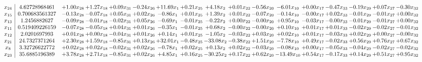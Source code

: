\documentclass[9pt]{article}
\begin{document}
 \[\begin{array}{c| c c@{\hskip 2pt} c@{\hskip 2pt} c@{\hskip 2pt} c@{\hskip 2pt} c@{\hskip 2pt} c@{\hskip 2pt} c@{\hskip 2pt} c@{\hskip 2pt} c@{\hskip 2pt} c@{\hskip 2pt} c@{\hskip 2pt} c@{\hskip 2pt} c@{\hskip 2pt} c@{\hskip 2pt} c@{\hskip 2pt} }
 x_{24}   &  4.62728968461 & +  1.00 x_{28} & +  1.27 x_{18} & +  0.09 x_{31} & -0.24 x_{26} & + 11.69 x_{1} & +  0.21 x_{25} & +  4.18 x_{2} & +  0.01 x_{22} & -0.56 x_{20} & -6.01 x_{10} & +  0.00 x_{17} & -0.47 x_{33} & -0.19 x_{29} & +  0.07 x_{27} & -0.30 x_{32}\\
 x_{15}   &  0.700683561327 & -0.13 x_{28} & -0.07 x_{18} & +  0.05 x_{31} & +  0.02 x_{26} & -0.86 x_{1} & +  0.01 x_{25} & +  1.39 x_{2} & +  0.01 x_{22} & -0.07 x_{20} & -0.14 x_{10} & -0.00 x_{17} & +  0.02 x_{33} & -0.01 x_{29} & -0.01 x_{27} & +  0.00 x_{32}\\
 x_{13}   &  1.2456882627 & -0.09 x_{28} & -0.01 x_{18} & -0.02 x_{31} & +  0.05 x_{26} & -0.69 x_{1} & -0.01 x_{25} & -0.22 x_{2} & +  0.00 x_{22} & -0.00 x_{20} & +  0.95 x_{10} & -0.03 x_{17} & -0.00 x_{33} & -0.01 x_{29} & -0.01 x_{27} & +  0.00 x_{32}\\
 x_{11}   &  0.519409226159 & -0.07 x_{28} & -0.05 x_{18} & +  0.04 x_{31} & +  0.01 x_{26} & -0.35 x_{1} & -0.01 x_{25} & +  0.68 x_{2} & -0.00 x_{22} & -0.00 x_{20} & +  0.10 x_{10} & +  0.01 x_{17} & +  0.01 x_{33} & -0.02 x_{29} & -0.02 x_{27} & -0.01 x_{32}\\
 x_{12}   &  2.0201697993 & +  0.01 x_{28} & +  0.00 x_{18} & -0.04 x_{31} & +  0.01 x_{26} & +  0.14 x_{1} & +  0.01 x_{25} & -1.05 x_{2} & -0.03 x_{22} & +  0.03 x_{20} & +  0.02 x_{10} & +  0.01 x_{17} & -0.03 x_{33} & +  0.02 x_{29} & +  0.00 x_{27} & -0.00 x_{32}\\
 x_{21}   &  24.7327371264 & +  2.30 x_{28} & +  1.59 x_{18} & -0.85 x_{31} & +  0.13 x_{26} & + 32.01 x_{1} & -0.48 x_{25} & -33.08 x_{2} & -0.38 x_{22} & +  1.51 x_{20} & -7.78 x_{10} & +  0.49 x_{17} & -0.02 x_{33} & +  0.56 x_{29} & +  0.76 x_{27} & +  0.67 x_{32}\\
 x_{8}   &  3.32726622772 & +  0.02 x_{28} & +  0.02 x_{18} & -0.02 x_{31} & +  0.02 x_{26} & -0.78 x_{1} & +  0.02 x_{25} & +  0.13 x_{2} & +  0.02 x_{22} & -0.03 x_{20} & -0.08 x_{10} & +  0.00 x_{17} & -0.05 x_{33} & -0.04 x_{29} & -0.02 x_{27} & -0.02 x_{32}\\
 x_{23}   &  35.6885196389 & +  3.78 x_{28} & +  2.71 x_{18} & -0.85 x_{31} & +  0.02 x_{26} & +  4.85 x_{1} & +  0.16 x_{25} & -30.25 x_{2} & +  0.17 x_{22} & +  0.62 x_{20} & -13.49 x_{10} & +  0.54 x_{17} & -0.17 x_{33} & +  0.14 x_{29} & +  0.51 x_{27} & +  0.95 x_{32}\\

\end{array}\]
\end{document}
